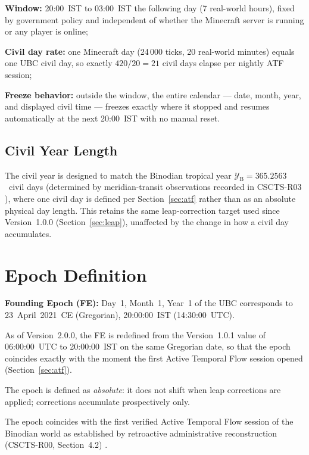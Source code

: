 \documentclass[journal,twoside]{IEEEtran}
\begin{document}
\begin{IEEEitemize}
  \item \textbf{Window:} 20:00~IST to 03:00~IST the following day (7 real-world hours),
        fixed by government policy and independent of whether the Minecraft server is
        running or any player is online;
  \item \textbf{Civil day rate:} one Minecraft day (24\,000 ticks, 20 real-world minutes)
        equals one UBC civil day, so exactly $420 / 20 = 21$ civil days elapse per nightly
        ATF session;
  \item \textbf{Freeze behavior:} outside the window, the entire calendar --- date, month,
        year, and displayed civil time --- freezes exactly where it stopped and resumes
        automatically at the next 20:00~IST with no manual reset.
\end{IEEEitemize}

\subsection{Civil Year Length}

The civil year is designed to match the Binodian tropical year
$\mathcal{Y}_{\mathrm{B}} = 365.2563$~civil days (determined by meridian-transit
observations recorded in CSCTS-R03 \cite{cscts_r03}), where one civil day is defined per
Section~\ref{sec:atf} rather than as an absolute physical day length. This retains the
same leap-correction target used since Version~1.0.0 (Section~\ref{sec:leap}), unaffected
by the change in how a civil day accumulates.

\section{Epoch Definition}

\begin{IEEEitemize}
  \item \textbf{Founding Epoch (FE):} Day~1, Month~1, Year~1 of the UBC corresponds to
        23~April~2021~CE (Gregorian), 20:00:00~IST (14:30:00~UTC).
  \item As of Version~2.0.0, the FE is redefined from the Version~1.0.1 value of
        06:00:00~UTC to 20:00:00~IST on the same Gregorian date, so that the epoch
        coincides exactly with the moment the first Active Temporal Flow session opened
        (Section~\ref{sec:atf}).
  \item The epoch is defined as \emph{absolute}: it does not shift when leap corrections
        are applied; corrections accumulate prospectively only.
  \item The epoch coincides with the first verified Active Temporal Flow session of the
        Binodian world as established by retroactive administrative reconstruction
        (CSCTS-R00, Section~4.2) \cite{cscts_r00}.
\end{IEEEitemize}
\end{document}
